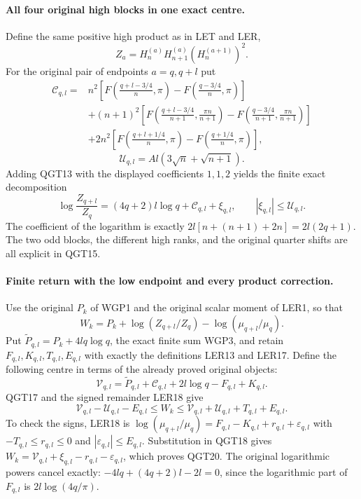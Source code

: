 \documentclass[11pt,a4paper]{article}
\begin{document}
\paragraph{All four original high blocks in one exact centre.}
Define the same positive high product as in LET and LER,
\[
 Z_a=H_n^{(a)}H_{n+1}^{(a)}(H_n^{(a+1)})^2.
\]
For the original pair of endpoints $a=q,q+l$ put
\[
\begin{split}
 \mathcal C_{q,l}={}&n^2\left[
 F\left(\frac{q+l-3/4}{n},\pi\right)
 -F\left(\frac{q-3/4}{n},\pi\right)\right]\\
 &+(n+1)^2\left[
 F\left(\frac{q+l-3/4}{n+1},\frac{\pi n}{n+1}\right)
 -F\left(\frac{q-3/4}{n+1},\frac{\pi n}{n+1}\right)\right]\\
 &+2n^2\left[
 F\left(\frac{q+l+1/4}{n},\pi\right)
 -F\left(\frac{q+1/4}{n},\pi\right)\right],
\end{split}
 \tag{QGT15}
\]
\[
 \mathcal U_{q,l}=Al(3\sqrt n+\sqrt{n+1}).
 \tag{QGT16}
\]
Adding QGT13 with the displayed coefficients $1,1,2$ yields the
finite exact decomposition
\[
 \boxed{\log\frac{Z_{q+l}}{Z_q}
       =(4q+2)l\log q+\mathcal C_{q,l}+\xi_{q,l},
              \qquad |\xi_{q,l}|\le\mathcal U_{q,l}.}
 \tag{QGT17}
\]
The coefficient of the logarithm is exactly
$2l[n+(n+1)+2n]=2l(2q+1)$. The two odd blocks, the different
high ranks, and the original quarter shifts are all explicit in QGT15.

\paragraph{Finite return with the low endpoint and every product correction.}
Use the original $P_k$ of WGP1 and the original scalar moment of LER1,
so that
\[
 W_k=P_k+\log(Z_{q+l}/Z_q)-\log(\mu_{q+l}/\mu_q).
 \tag{QGT18}
\]
Put $\widetilde P_{q,l}=P_k+4lq\log q$, the exact finite sum WGP3,
and retain $F_{q,l},K_{q,l},T_{q,l},E_{q,l}$ with exactly the
definitions LER13 and LER17. Define the following centre in terms of
the already proved original objects:
\[
 \mathcal V_{q,l}=\widetilde P_{q,l}+\mathcal C_{q,l}
                         +2l\log q-F_{q,l}+K_{q,l}.
 \tag{QGT19}
\]
QGT17 and the signed remainder LER18 give
\[
 \boxed{\mathcal V_{q,l}-\mathcal U_{q,l}-E_{q,l}
       \le W_k\le
       \mathcal V_{q,l}+\mathcal U_{q,l}+T_{q,l}+E_{q,l}.}
 \tag{QGT20}
\]
To check the signs, LER18 is
$\log(\mu_{q+l}/\mu_q)=F_{q,l}-K_{q,l}+r_{q,l}+\varepsilon_{q,l}$
with $-T_{q,l}\le r_{q,l}\le0$ and
$|\varepsilon_{q,l}|\le E_{q,l}$. Substitution in QGT18 gives
$W_k=\mathcal V_{q,l}+\xi_{q,l}-r_{q,l}-\varepsilon_{q,l}$,
which proves QGT20. The original logarithmic powers cancel exactly:
$-4lq+(4q+2)l-2l=0$, since the logarithmic part of $F_{q,l}$ is
$2l\log(4q/\pi)$.
\end{document}

